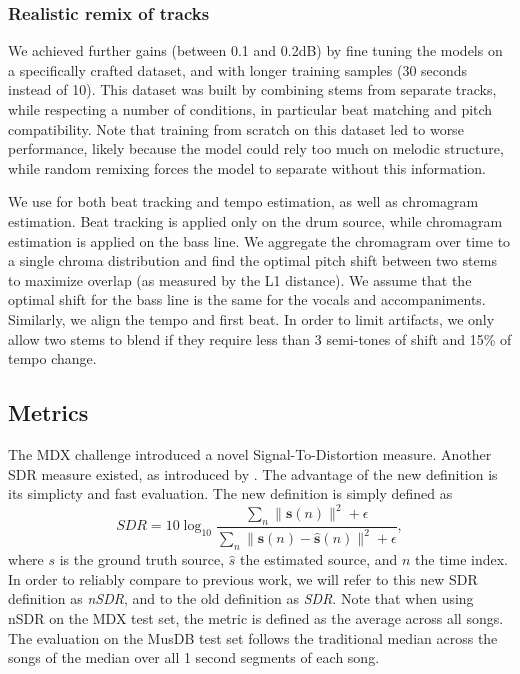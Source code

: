 \documentclass[10pt,a4paper,onecolumn]{article}
\let\textttOrig=\texttt
\def\texttt#1{\expandafter\textttOrig{\seqsplit{#1}}}
\begin{document}
\hypertarget{realistic-remix-of-tracks}{%
\subsubsection{Realistic remix of
tracks}\label{realistic-remix-of-tracks}}

We achieved further gains (between 0.1 and 0.2dB) by fine tuning the
models on a specifically crafted dataset, and with longer training
samples (30 seconds instead of 10). This dataset was built by combining
stems from separate tracks, while respecting a number of conditions, in
particular beat matching and pitch compatibility. Note that training
from scratch on this dataset led to worse performance, likely because
the model could rely too much on melodic structure, while random
remixing forces the model to separate without this information.

We use \texttt{librosa} \citep{librosa} for both beat tracking and tempo
estimation, as well as chromagram estimation. Beat tracking is applied
only on the drum source, while chromagram estimation is applied on the
bass line. We aggregate the chromagram over time to a single chroma
distribution and find the optimal pitch shift between two stems to
maximize overlap (as measured by the L1 distance). We assume that the
optimal shift for the bass line is the same for the vocals and
accompaniments. Similarly, we align the tempo and first beat. In order
to limit artifacts, we only allow two stems to blend if they require
less than 3 semi-tones of shift and 15\% of tempo change.

\hypertarget{metrics}{%
\subsection{Metrics}\label{metrics}}

The MDX challenge introduced a novel Signal-To-Distortion measure.
Another SDR measure existed, as introduced by \citet{measures}. The
advantage of the new definition is its simplicty and fast evaluation.
The new definition is simply defined as \begin{equation}
SDR = 10 \log_{10} \frac{\sum_{n} \lVert\mathbf{s}(n)\rVert^2 + \epsilon}{\sum_{n}\lVert\mathbf{s}(n)-\hat{\mathbf{s}}(n)\rVert^2 + \epsilon},
\label{eq:sdr}
\end{equation} where \(s\) is the ground truth source, \(\hat{s}\) the
estimated source, and \(n\) the time index. In order to reliably compare
to previous work, we will refer to this new SDR definition as
\emph{nSDR}, and to the old definition as \emph{SDR}. Note that when
using nSDR on the MDX test set, the metric is defined as the average
across all songs. The evaluation on the MusDB test set follows the
traditional median across the songs of the median over all 1 second
segments of each song.
\end{document}
